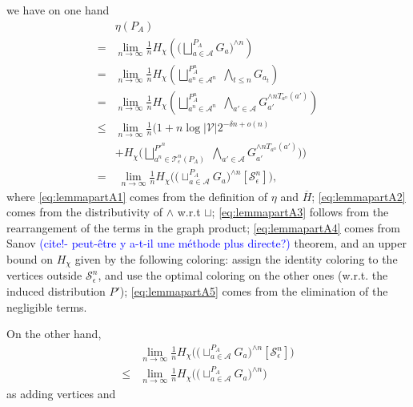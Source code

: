\documentclass[conference,a4paper]{IEEEtran}
\begin{document}

\iffalse
we have on one hand
\begin{align}
    & \eta(P_A) \nonumber\\
    = & \lim_{n \rightarrow \infty} \frac{1}{n} H_\chi\left(\bigg(\bigsqcup^{P_A}_{a \in \mathcal{A}} G_a \bigg)^{\wedge n}\right)\label{eq:lemmapartA1}\\
    = & \lim_{n \rightarrow \infty} \frac{1}{n} H_\chi\left(\bigsqcup^{P^n_A}_{a^n \in \mathcal{A}^n} \; \bigwedge_{t \leq n} G_{a_t} \right) \label{eq:lemmapartA2}\\
    = & \lim_{n \rightarrow \infty} \frac{1}{n} H_\chi\left(\bigsqcup^{P^n_A}_{a^n \in \mathcal{A}^n} \; \bigwedge_{a' \in \mathcal{A}} G_{a'}^{\wedge n T_{a^n}(a')} \right)\label{eq:lemmapartA3}\\
    \leq & \lim_{n \rightarrow \infty} \frac{1}{n}\Bigg( 1 + n\log|\mathcal{V}|2^{-\delta n + o(n)} \nonumber\\
    & + H_\chi\bigg(\bigsqcup^{P'^n}_{a^n \in \mathcal{T}^n_\epsilon(P_A)} \; \bigwedge_{a' \in \mathcal{A}} G_{a'}^{\wedge n T_{a^n}(a')} \bigg) \Bigg) \label{eq:lemmapartA4}\\
    = & \; \lim_{n\rightarrow \infty} \frac{1}{n} H_\chi\Big(\big({\sqcup}^{P_A}_{a \in \mathcal{A}} G_a\big)^{\wedge n}[\mathcal{S}^n_\epsilon]\Big),\label{eq:lemmapartA5}
\end{align} 
where \eqref{eq:lemmapartA1} comes from the definition of $\eta$ and $\overline{H}$; \eqref{eq:lemmapartA2} comes from the distributivity of $\wedge$ w.r.t $\sqcup$; \eqref{eq:lemmapartA3} follows from the rearrangement of the terms in the graph product; \eqref{eq:lemmapartA4} comes from Sanov \textcolor{blue}{(cite!- peut-être y a-t-il une méthode plus directe?)} theorem, and an upper bound on $H_\chi$ given by the following coloring: assign the identity coloring to the vertices outside $\mathcal{S}^n_\epsilon$, and use the optimal coloring on the other ones (w.r.t. the induced distribution $P'$); \eqref{eq:lemmapartA5} comes from the elimination of the negligible terms.

On the other hand, 
\begin{align}
    & \lim_{n\rightarrow \infty} \frac{1}{n} H_\chi\Big(\big({\sqcup}^{P_A}_{a \in \mathcal{A}} G_a\big)^{\wedge n}[\mathcal{S}^n_\epsilon]\Big) \\
    \leq & \lim_{n\rightarrow \infty} \frac{1}{n} H_\chi\Big(\big({\sqcup}^{P_A}_{a \in \mathcal{A}} G_a\big)^{\wedge n}\Big) 
\end{align}
as adding vertices and 
\end{document}
